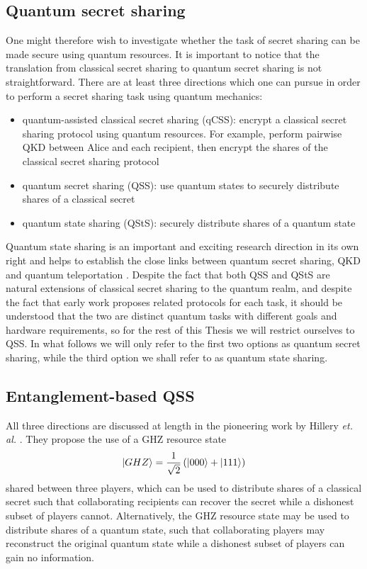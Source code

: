 \subsection{Quantum secret sharing}
One might therefore wish to investigate whether the task of secret sharing can be made secure using quantum resources. It is important to notice that the translation from classical secret sharing to quantum secret sharing is not straightforward. There are at least three directions which one can pursue in order to perform a secret sharing task using quantum mechanics:

\begin{itemize}
\item quantum-assisted classical secret sharing (qCSS): encrypt a classical secret sharing protocol \cite{Shamir1976, Blakley1979} using quantum resources. For example, perform pairwise QKD between Alice and each recipient, then encrypt the shares of the classical secret sharing protocol
\item quantum secret sharing (QSS): use quantum states to securely distribute shares of a classical secret
\item quantum state sharing (QStS): securely distribute shares of a quantum state
\end{itemize}

Quantum state sharing is an important and exciting research direction in its own right and helps to establish the close links between quantum secret sharing, QKD and quantum teleportation \cite{Braunstein1998}. Despite the fact that both QSS and QStS are natural extensions of classical secret sharing to the quantum realm, and despite the fact that early work \cite{Hillery1999} proposes related protocols for each task, it should be understood that the two are distinct quantum tasks with different goals and hardware requirements, so for the rest of this Thesis we will restrict ourselves to QSS. In what follows we will only refer to the first two options as quantum secret sharing, while the third option we shall refer to as quantum state sharing.

\subsection{Entanglement-based QSS}

All three directions are discussed at length in the pioneering work by Hillery \emph{et. al.} \cite{Hillery1999}. They propose the use of a GHZ resource state
\begin{equation}
\ket{GHZ} = \frac{1}{\sqrt{2}} \left(\ket{000} + \ket{111} \right)
\end{equation}
shared between three players, which can be used to distribute shares of a classical secret such that collaborating recipients can recover the secret while a dishonest subset of players cannot. Alternatively, the GHZ resource state may be used to distribute shares of a quantum state, such that collaborating players may reconstruct the original quantum state while a dishonest subset of players can gain no information.

